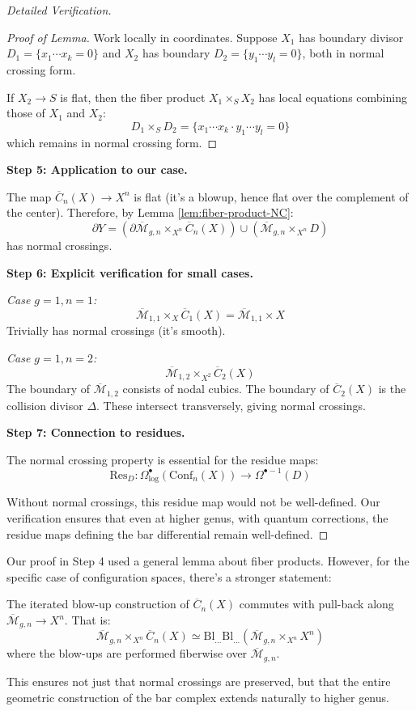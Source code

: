 \begin{proof}[Detailed Verification]
\begin{proof}[Proof of Lemma]
Work locally in coordinates. Suppose $X_1$ has boundary divisor $D_1 = \{x_1 \cdots x_k = 0\}$ 
and $X_2$ has boundary $D_2 = \{y_1 \cdots y_l = 0\}$, both in normal crossing form.

If $X_2 \to S$ is flat, then the fiber product $X_1 \times_S X_2$ has local equations 
combining those of $X_1$ and $X_2$:
$$D_1 \times_S D_2 = \{x_1 \cdots x_k \cdot y_1 \cdots y_l = 0\}$$
which remains in normal crossing form.
\end{proof}

\textbf{Step 5: Application to our case.}

The map $\overline{C}_n(X) \to X^n$ is flat (it's a blowup, hence flat over the complement 
of the center). Therefore, by Lemma \ref{lem:fiber-product-NC}:
$$\partial Y = (\partial \overline{\mathcal{M}}_{g,n} \times_{X^n} \overline{C}_n(X)) 
\cup (\overline{\mathcal{M}}_{g,n} \times_{X^n} D)$$
has normal crossings.

\textbf{Step 6: Explicit verification for small cases.}

\textit{Case $g=1, n=1$:} 
$$\overline{\mathcal{M}}_{1,1} \times_X \overline{C}_1(X) = \overline{\mathcal{M}}_{1,1} 
\times X$$
Trivially has normal crossings (it's smooth).

\textit{Case $g=1, n=2$:}
$$\overline{\mathcal{M}}_{1,2} \times_{X^2} \overline{C}_2(X)$$
The boundary of $\overline{\mathcal{M}}_{1,2}$ consists of nodal cubics. The boundary 
of $\overline{C}_2(X)$ is the collision divisor $\Delta$. These intersect transversely, 
giving normal crossings.

\textbf{Step 7: Connection to residues.}

The normal crossing property is essential for the residue maps:
$$\text{Res}_D: \Omega^{\bullet}_{\log}(\text{Conf}_n(X)) \to \Omega^{\bullet-1}(D)$$

Without normal crossings, this residue map would not be well-defined. Our verification 
ensures that even at higher genus, with quantum corrections, the residue maps defining 
the bar differential remain well-defined.

\end{proof}

\begin{remark}\label{rem:iterated-blowup}
Our proof in Step 4 used a general lemma about fiber products. However, for the specific 
case of configuration spaces, there's a stronger statement:

The iterated blow-up construction of $\overline{C}_n(X)$ commutes with pull-back along $\overline{\mathcal{M}}_{g,n} \to X^n$. That is:
$$\overline{\mathcal{M}}_{g,n} \times_{X^n} \overline{C}_n(X) \simeq 
\text{Bl}_{...} \text{Bl}_{...} (\overline{\mathcal{M}}_{g,n} \times_{X^n} X^n)$$
where the blow-ups are performed fiberwise over $\overline{\mathcal{M}}_{g,n}$.

This ensures not just that normal crossings are preserved, but that the entire geometric 
construction of the bar complex extends naturally to higher genus.
\end{remark}
